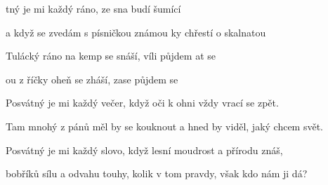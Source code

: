 

\zs
{}tný je mi každý ráno,
 ze sna budí šumící 

a když se zvedám s písničkou známou
ky chřestí o skalnatou 
\ks

\zr
Tulácký ráno na kemp se snáší,
víli půjdem at se 

ou z říčky oheň se zháší,
 zase půjdem  se 
\kr

\zs
Posvátný je mi každý večer,
když oči k ohni vždy vrací se zpět.

Tam mnohý z pánů měl by se kouknout
a hned by viděl, jaký chcem svět.
\ks

\zr \kr

\zs
Posvátný je mi každý slovo,
když lesní moudrost a přírodu znáš,

bobříků sílu a odvahu touhy,
kolik v tom pravdy, však kdo nám ji dá?
\ks

\zr \kr

\kp







